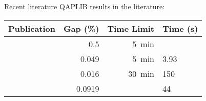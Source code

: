 {\begin{frame}{Recent literature}
        QAPLIB results in the literature:
        \begin{tabularx}{1.0\textwidth}{@{}l|rrX@{}}
            \toprule
            Publication & Gap (\%) & Time Limit & Time (s) \\
            \midrule
            \citep{Misevicius:2012dj} & 0.5 & \SI{5}{\minute} &  \\
            \citep{Harris:2015kw} & 0.049 & \SI{5}{\minute} & 3.93 \\
            \citep{Benlic:2015gp} & 0.016 & \SI{30}{\minute} & 150 \\
            \citep{Helal:2015de} & 0.0919 & & 44 \\
            \bottomrule
        \end{tabularx}
    \end{frame}
}

